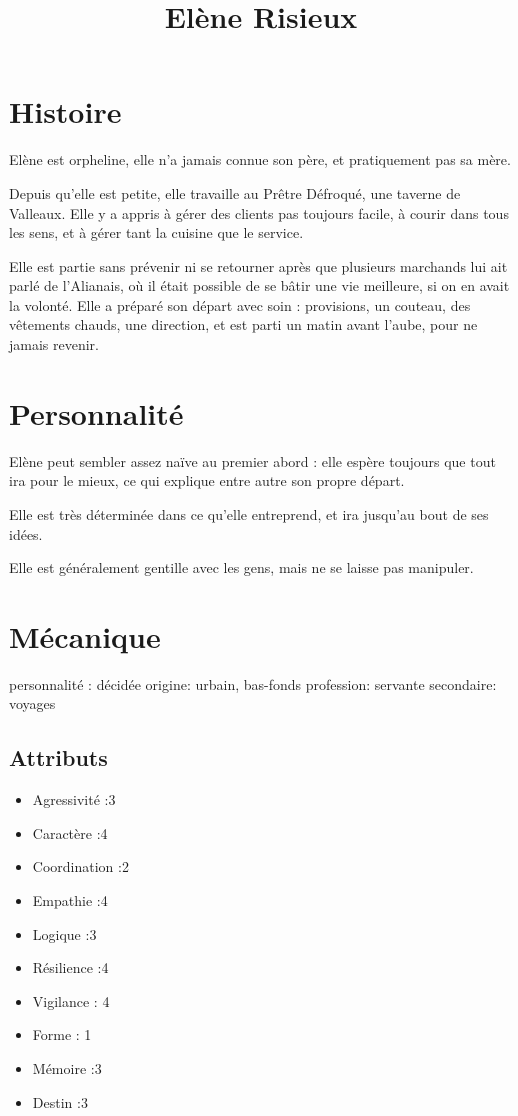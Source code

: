 \documentclass[10pt,a4paper]{article}
\title{Elène Risieux}
\begin{document}
\section{Histoire}
Elène est orpheline, elle n'a jamais connue son père, et pratiquement pas sa mère. 

Depuis qu'elle est petite, elle travaille au Prêtre Défroqué, une taverne de Valleaux. Elle y a appris à gérer des clients pas toujours facile, à courir dans tous les sens, et à gérer tant la cuisine que le service.

Elle est partie sans prévenir ni se retourner après que plusieurs marchands lui ait parlé de l'Alianais, où il était possible de se bâtir une vie meilleure, si on en avait la volonté. Elle a préparé son départ avec soin : provisions, un couteau, des vêtements chauds, une direction, et est parti un matin avant l'aube, pour ne jamais revenir.
\section{Personnalité}
Elène peut sembler assez naïve au premier abord : elle espère toujours que tout ira pour le mieux, ce qui explique entre autre son propre départ.

Elle est très déterminée dans ce qu'elle entreprend, et ira jusqu'au bout de ses idées.

Elle est généralement gentille avec les gens, mais ne se laisse pas manipuler.
\section{Mécanique}
personnalité : décidée
origine: urbain, bas-fonds
profession: servante
secondaire: voyages
\subsection{Attributs}
\begin{itemize}
\item Agressivité :3
\item Caractère :4
\item Coordination :2
\item Empathie :4
\item Logique :3
\item Résilience :4
\item Vigilance : 4
\item Forme : 1
\item Mémoire :3
\item Destin :3
\end{itemize}
\end{document}
